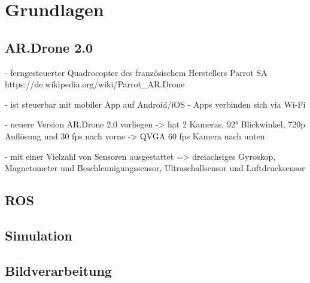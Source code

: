 \chapter{Grundlagen}
\label{cha:Fundamentals}

\section{AR.Drone 2.0}

- ferngesteuerter Quadrocopter des französischem Herstellers Parrot SA \\https://de.wikipedia.org/wiki/Parrot_AR.Drone

- ist steuerbar mit mobiler App auf Android/iOS
- Apps verbinden sich via Wi-Fi

- neuere Version AR.Drone 2.0 vorliegen
-> hat 2 Kameras, 92° Blickwinkel, 720p Auflösung und 30 fps nach vorne
-> QVGA 60 fps Kamera nach unten

- mit einer Vielzahl von Sensoren ausgestattet => dreiachsiges Gyroskop, Magnetometer und Beschleunigungssensor, Ultraschallsensor und Luftdrucksensor

 


\section{ROS}


\section{Simulation}


\section{Bildverarbeitung}
